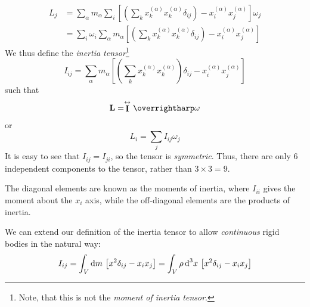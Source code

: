 \begin{align*}
	L_j &= \sum_\alpha m_\alpha\sum_i\left[\left(\sum_k x^{(\alpha)}_kx^{(\alpha)}_k\delta_{ij}\right)-x^{(\alpha)}_ix^{(\alpha)}_j\right]\omega_j\\
	    &=\sum_i \omega_i \sum_\alpha m_\alpha \left[\left(\sum_k x^{(\alpha)}_kx^{(\alpha)}_k\delta_{ij}\right)-x^{(\alpha)}_ix^{(\alpha)}_j\right]
\end{align*}
We thus define the \emph{inertia tensor}\footnote{Note, that this is not the \emph{moment of inertia tensor}.}
\begin{equation}
	I_{ij}=\sum_\alpha m_\alpha \left[\left(\sum_k x_k^{(\alpha)}x_k^{(\alpha)}\right)\delta_{ij}-x_{i}^{(\alpha)}x_j^{(\alpha)}\right]
\end{equation}
such that
\[\vb L = \stackrel{\leftrightarrow}{\vb I} \vv\omega\]
or
\[L_i = \sum_jI_{ij}\omega_j\]
It is easy to see that \(I_{ij} =I_{ji}\), so the tensor is \emph{symmetric}. Thus, there are only 6 independent components to the tensor, rather than \(3\times 3=9\).

The diagonal elements are known as the moments of inertia, where \(I_{ii}\) gives the moment about the \(x_i\) axis, while the off-diagonal elements are the products of inertia. 

We can extend our definition of the inertia tensor to allow \emph{continuous} rigid bodies in the natural way:
\begin{equation}
	I_{ij} = \int_V\d{m} \left[x^2\delta_{ij} - x_ix_j\right] = \int_V\rho\d[3]{x}\left[x^2\delta_{ij}-x_ix_j\right]
\end{equation}

